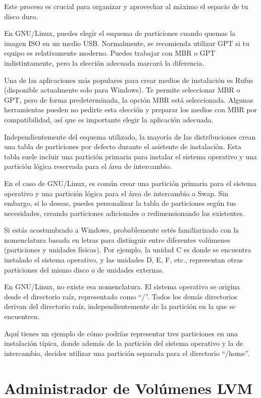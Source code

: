 \documentclass[
  a4paper,
]{article}
\begin{document}
Este proceso es crucial para organizar y aprovechar al máximo el espacio
de tu disco duro.

En GNU/Linux, puedes elegir el esquema de particiones cuando quemas la
imagen ISO en un medio USB. Normalmente, se recomienda utilizar GPT si
tu equipo es relativamente moderno. Puedes trabajar con MBR o GPT
indistintamente, pero la elección adecuada marcará la diferencia.

Una de las aplicaciones más populares para crear medios de instalación
es Rufus (disponible actualmente solo para Windows). Te permite
seleccionar MBR o GPT, pero de forma predeterminada, la opción MBR está
seleccionada. Algunas herramientas pueden no pedirte esta elección y
preparar los medios con MBR por compatibilidad, así que es importante
elegir la aplicación adecuada.

Independientemente del esquema utilizado, la mayoría de las
distribuciones crean una tabla de particiones por defecto durante el
asistente de instalación. Esta tabla suele incluir una partición
primaria para instalar el sistema operativo y una partición lógica
reservada para el área de intercambio.

En el caso de GNU/Linux, es común crear una partición primaria para el
sistema operativo y una partición lógica para el área de intercambio o
Swap. Sin embargo, si lo deseas, puedes personalizar la tabla de
particiones según tus necesidades, creando particiones adicionales o
redimensionando las existentes.

Si estás acostumbrado a Windows, probablemente estés familiarizado con
la nomenclatura basada en letras para distinguir entre diferentes
volúmenes (particiones y unidades físicas). Por ejemplo, la unidad C es
donde se encuentra instalado el sistema operativo, y las unidades D, E,
F, etc., representan otras particiones del mismo disco o de unidades
externas.

En GNU/Linux, no existe esa nomenclatura. El sistema operativo se
origina desde el directorio raíz, representado como ``/''. Todos los
demás directorios derivan del directorio raíz, independientemente de la
partición en la que se encuentren.

Aquí tienes un ejemplo de cómo podrías representar tres particiones en
una instalación típica, donde además de la partición del sistema
operativo y la de intercambio, decides utilizar una partición separada
para el directorio ``/home''.

\hypertarget{administrador-de-voluxfamenes-lvm}{%
\section{Administrador de Volúmenes
LVM}\label{administrador-de-voluxfamenes-lvm}}
\end{document}
